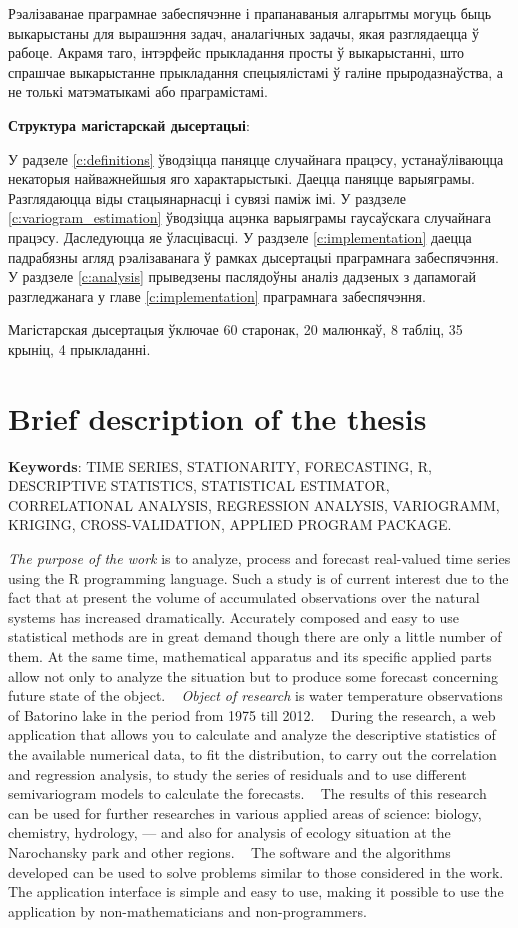 Рэалізаванае праграмнае забеспячэнне і прапанаваныя алгарытмы могуць быць выкарыстаны для вырашэння задач, аналагічных задачы, якая разглядаецца ў рабоце. Акрамя таго, інтэрфейс прыкладання просты ў выкарыстанні, што спрашчае выкарыстанне прыкладання спецыялістамі ў галіне прыродазнаўства, а не толькі матэматыкамі або праграмістамі.

\textbf{Структура магістарскай дысертацыі}:

У радзеле \ref{c:definitions} ўводзіцца паняцце случайнага працэсу, устанаўліваюцца некаторыя найважнейшыя яго характарыстыкі. Даецца паняцце варыяграмы. Разглядаюцца віды стацыянарнасці і сувязі паміж імі. У раздзеле \ref {c:variogram_estimation} ўводзіцца ацэнка варыяграмы гаусаўскага случайнага працэсу. Даследуюцца яе ўласцівасці. У раздзеле \ref{c:implementation} даецца падрабязны агляд рэалізаванага ў рамках дысертацыі праграмнага забеспячэння. У раздзеле \ref{c:analysis} прыведзены паслядоўны аналіз дадзеных з дапамогай разгледжанага у главе \ref{c:implementation} праграмнага забеспячэння.

Магістарская дысертацыя ўключае 60 старонак, 20 малюнкаў, 8 табліц, 35 крыніц, 4 прыкладанні.

\newpage

\chapter*{Brief description of the thesis}

\textbf{Keywords}: TIME SERIES, STATIONARITY, FORECASTING, R, DESCRIPTIVE STATISTICS, STATISTICAL ESTIMATOR, CORRELATIONAL ANALYSIS, REGRESSION ANALYSIS, VARIOGRAMM, KRIGING, CROSS-VALIDATION, APPLIED PROGRAM PACKAGE\@.

\textit{The purpose of the work} is to analyze, process and forecast real-valued time series using the R programming language. Such a study is of current interest due to the fact that at present the volume of accumulated observations over the natural systems has increased dramatically. Accurately composed and easy to use statistical methods are in great demand though there are only a little number of them. At the same time, mathematical apparatus and its specific applied parts allow not only to analyze the situation but to produce some forecast concerning future state of the object.
 
\textit{Object of research} is water temperature observations of Batorino lake in the period from 1975 till 2012.
 
During the research, a web application that allows you to calculate and analyze the descriptive statistics of the available numerical data, to fit the distribution, to carry out the correlation and regression analysis, to study the series of residuals and to use different semivariogram models to calculate the forecasts.
 
The results of this research can be used for further researches in various applied areas of science: biology, chemistry, hydrology, --- and also for analysis of ecology situation at the Narochansky park and other regions.
 
The software and the algorithms developed can be used to solve problems similar to those considered in the work. The application interface is simple and easy to use, making it possible to use the application by non-mathematicians and non-programmers.

